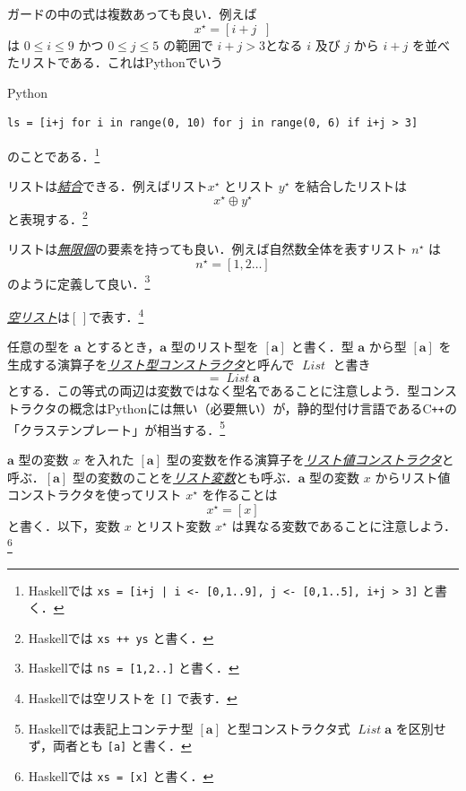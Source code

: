 \documentclass[a4paper]{jsbook}
\newcommand{\programminglanguage}[1]{\textsf{#1}}
\newcommand{\cxx}{\programminglanguage{C}\texttt{++}}
\newcommand{\haskell}{\programminglanguage{Haskell}}
\newcommand{\python}{\programminglanguage{Python}}
\newcommand{\keyword}[1]{{\underline{\emph{#1}}}}
\newcommand{\code}[1]{\texttt{#1}}
\newenvironment{pythoncode}{\begin{itembox}[r]{\python}}{\end{itembox}}
\newcommand{\mType}[1]{\mathbf{#1}}
\newcommand{\mListType}[1]{[\mType{#1}]}
\newcommand{\mTypeConstructor}[1]{\mathit{#1}} %
\newcommand{\mEmptyList}{{[\,]}}
\newcommand{\mListWith}[1]{\left[#1\right]}
\newcommand{\mList}[1]{{#1}^\mathrm{\star}}
\newcommand{\mGuard}[1]{\mathop{\mid_{#1}}}
\DeclareMathOperator{\mAppend}{\oplus}
\DeclareMathOperator{\mFrom}{\in}
\DeclareMathOperator{\mListTypeConstructor}{\mTypeConstructor{List}}
\begin{document}
ガードの中の式は複数あっても良い．例えば
\begin{equation}
\mList{x}
=\mListWith{i+j\mGuard{i\mFrom\mListWith{0,1\dots9},\,j\mFrom\mListWith{0,1\dots5},\,i+j>3}}
\end{equation}
は $0\le i\le9$ かつ $0\le j\le5$ の範囲で $i+j>3$となる $i$ 及び $j$ から $i+j$ を並べたリストである．これは\python でいう
\begin{pythoncode}
\begin{verbatim}
ls = [i+j for i in range(0, 10) for j in range(0, 6) if i+j > 3]
\end{verbatim}
\end{pythoncode}
のことである．\footnote{\haskell では \code{xs = [i+j | i <- [0,1..9], j <- [0,1..5], i+j > 3]} と書く．}

リストは\keyword{結合}できる．例えばリスト$\mList{x}$ とリスト $\mList{y}$ を結合したリストは
\begin{equation}
\mList{x}\mAppend\mList{y}
\end{equation}
と表現する．\footnote{\haskell では \code{xs ++ ys} と書く．}

リストは\keyword{無限個}の要素を持っても良い．例えば自然数全体を表すリスト $\mList{n}$ は
\begin{equation}
\mList{n}=\mListWith{1,2\dots}
\end{equation}
のように定義して良い．\footnote{\haskell では \code{ns = [1,2..]} と書く．}

\keyword{空リスト}は$\mEmptyList$で表す．\footnote{\haskell では空リストを \code{[]} で表す．}

任意の型を $\mType{a}$ とするとき，$\mType{a}$ 型のリスト型を $\mListType{a}$ と書く．型 $\mType{a}$ から型 $\mListType{a}$ を生成する演算子を\keyword{リスト型コンストラクタ}と呼んで $\mListTypeConstructor$ と書き
\begin{equation}
\mListType{a}=\mListTypeConstructor\mType{a}
\end{equation}
とする．この等式の両辺は変数ではなく型名であることに注意しよう．型コンストラクタの概念は\python には無い（必要無い）が，静的型付け言語である\cxx の「クラステンプレート」が相当する．\footnote{\haskell では表記上コンテナ型 $\mListType{a}$ と型コンストラクタ式 $\mListTypeConstructor\mType{a}$ を区別せず，両者とも \code{[a]} と書く．}

$\mType{a}$ 型の変数 $x$ を入れた $\mListType{a}$ 型の変数を作る演算子を\keyword{リスト値コンストラクタ}と呼ぶ．$\mListType{a}$ 型の変数のことを\keyword{リスト変数}とも呼ぶ．$\mType{a}$ 型の変数 $x$ からリスト値コンストラクタを使ってリスト $\mList{x}$ を作ることは
\begin{equation}
\mList{x}=\mListWith{x}
\end{equation}
と書く．以下，変数 $x$ とリスト変数 $\mList{x}$ は異なる変数であることに注意しよう．\footnote{\haskell では \code{xs = [x]} と書く．}
\end{document}
